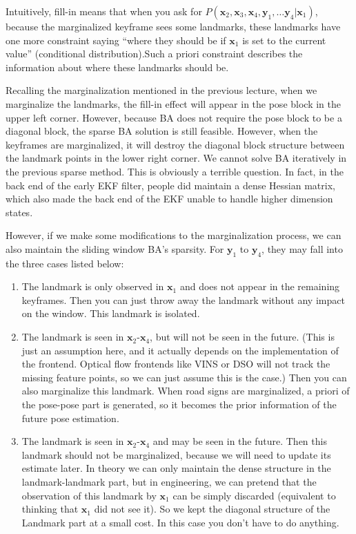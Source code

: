 Intuitively, fill-in means that when you ask for $P(\bm{x}_2, \bm{x}_3, \bm{x}_4, \bm{y}_1, \ldots \bm{y}_4|\bm{x}_1)$, because the marginalized keyframe sees some landmarks, these landmarks have one more constraint saying ``where they should be if $\bm{x}_1$ is set to the current value'' (conditional distribution).Such a priori constraint describes the information about where these landmarks should be.

Recalling the marginalization mentioned in the previous lecture, when we marginalize the landmarks, the fill-in effect will appear in the pose block in the upper left corner. However, because BA does not require the pose block to be a diagonal block, the sparse BA solution is still feasible. However, when the keyframes are marginalized, it will destroy the diagonal block structure between the landmark points in the lower right corner. We cannot solve BA iteratively in the previous sparse method. This is obviously a terrible question. In fact, in the back end of the early EKF filter, people did maintain a dense Hessian matrix, which also made the back end of the EKF unable to handle higher dimension states.

However, if we make some modifications to the marginalization process, we can also maintain the sliding window BA's sparsity. For $\bm{y}_1$ to $\bm{y}_4$, they may fall into the three cases listed below:

\begin{enumerate}
	\item The landmark is only observed in $\bm{x}_1$ and does not appear in the remaining keyframes. Then you can just throw away the landmark without any impact on the window. This landmark is isolated.
	\item The landmark is seen in $\bm{x}_2$-$\bm{x}_4$, but will not be seen in the future. (This is just an assumption here, and it actually depends on the implementation of the frontend. Optical flow frontends like VINS \cite{Qin2018} or DSO will not track the missing feature points, so we can just assume this is the case.) Then you can also marginalize this landmark. When road signs are marginalized, a priori of the pose-pose part is generated, so it becomes the prior information of the future pose estimation.
	\item The landmark is seen in $\bm{x}_2$-$\bm{x}_4$ and may be seen in the future. Then this landmark should not be marginalized, because we will need to update its estimate later. In theory we can only maintain the dense structure in the landmark-landmark part, but in engineering, we can pretend that the observation of this landmark by $\bm{x}_1$ can be simply discarded (equivalent to thinking that $\bm{x}_1$ did not see it). So we kept the diagonal structure of the Landmark part at a small cost. In this case you don't have to do anything.	
\end{enumerate}


